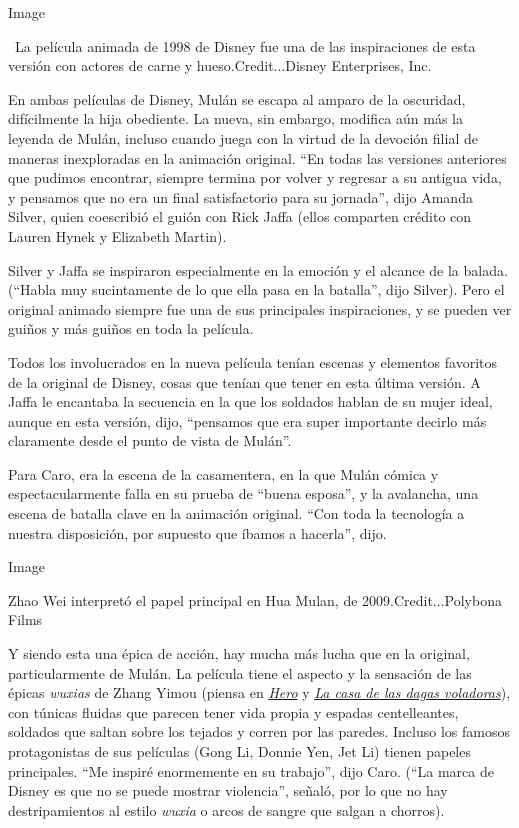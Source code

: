 Image

~La película animada de 1998 de Disney fue una de las inspiraciones de
esta versión con actores de carne y hueso.Credit...Disney Enterprises,
Inc.

En ambas películas de Disney, Mulán se escapa al amparo de la oscuridad,
difícilmente la hija obediente. La nueva, sin embargo, modifica aún más
la leyenda de Mulán, incluso cuando juega con la virtud de la devoción
filial de maneras inexploradas en la animación original. ``En todas las
versiones anteriores que pudimos encontrar, siempre termina por volver y
regresar a su antigua vida, y pensamos que no era un final satisfactorio
para su jornada'', dijo Amanda Silver, quien coescribió el guión con
Rick Jaffa (ellos comparten crédito con Lauren Hynek y Elizabeth
Martin).

Silver y Jaffa se inspiraron especialmente en la emoción y el alcance de
la balada. (``Habla muy sucintamente de lo que ella pasa en la
batalla'', dijo Silver). Pero el original animado siempre fue una de sus
principales inspiraciones, y se pueden ver guiños y más guiños en toda
la película.

Todos los involucrados en la nueva película tenían escenas y elementos
favoritos de la original de Disney, cosas que tenían que tener en esta
última versión. A Jaffa le encantaba la secuencia en la que los soldados
hablan de su mujer ideal, aunque en esta versión, dijo, ``pensamos que
era super importante decirlo más claramente desde el punto de vista de
Mulán''.

Para Caro, era la escena de la casamentera, en la que Mulán cómica y
espectacularmente falla en su prueba de ``buena esposa'', y la
avalancha, una escena de batalla clave en la animación original. ``Con
toda la tecnología a nuestra disposición, por supuesto que íbamos a
hacerla'', dijo.

Image

Zhao Wei interpretó el papel principal en Hua Mulan, de
2009.Credit...Polybona Films

Y siendo esta una épica de acción, hay mucha más lucha que en la
original, particularmente de Mulán. La película tiene el aspecto y la
sensación de las épicas \emph{wuxias} de Zhang Yimou (piensa en
\href{https://www.nytimes3xbfgragh.onion/2004/08/27/movies/film-review-crouching-tiger-hidden-truths-court-king-who-would-be-emperor.html}{\emph{Hero}}
y
\href{https://www.nytimes3xbfgragh.onion/2004/10/09/movies/silk-brocade-soaked-in-blood-and-passion.html}{\emph{La
casa de las dagas voladoras}}), con túnicas fluidas que parecen tener
vida propia y espadas centelleantes, soldados que saltan sobre los
tejados y corren por las paredes. Incluso los famosos protagonistas de
sus películas (Gong Li, Donnie Yen, Jet Li) tienen papeles principales.
``Me inspiré enormemente en su trabajo'', dijo Caro. (``La marca de
Disney es que no se puede mostrar violencia'', señaló, por lo que no hay
destripamientos al estilo \emph{wuxia} o arcos de sangre que salgan a
chorros).

